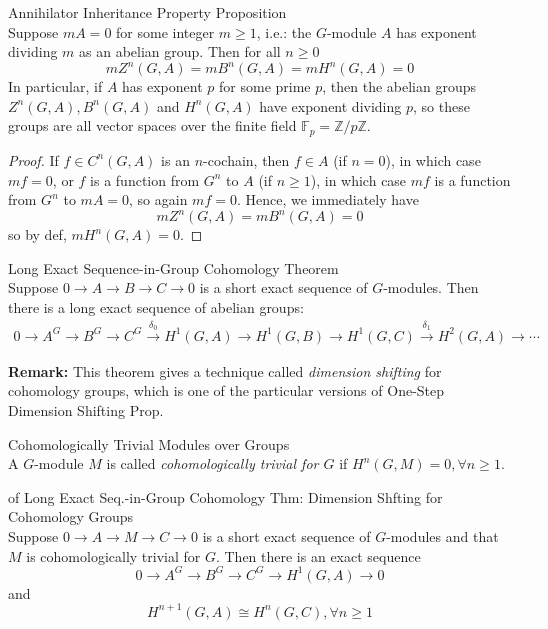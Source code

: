 \begin{proposition}{Annihilator Inheritance Property Proposition}\\
Suppose $mA=0$ for some integer $m\geq 1$, i.e.: the $G$-module $A$ has exponent dividing $m$ as an abelian group. Then for all $n\geq0$
\[
mZ^n(G,A)=m B^n(G,A)=m H^n(G,A)=0
\]
In particular, if $A$ has exponent $p$ for some prime $p$, then the abelian groups $Z^n(G,A), B^n(G,A)$ and $H^n(G,A)$ have exponent dividing $p$, so these groups are all vector spaces over the finite field $\mathbb{F}_p= \mathbb{Z}/p \mathbb{Z}$.
\end{proposition}

\begin{proof}
    If $f\in C^n(G,A)$ is an $n$-cochain, then $f\in A$ (if $n=0$), in which case $mf=0$, or $f$ is a function from $G^n$ to $A$ (if $n\geq1$), in which case $mf$ is a function from $G^n$ to $mA=0$, so again $mf=0$. Hence, we immediately have
    \[
    mZ^n(G,A)=mB^n(G,A)=0
    \]
    so by def, $mH^n(G,A)=0$.
\end{proof}

\begin{theorem}{Long Exact Sequence-in-Group Cohomology Theorem}\\
Suppose $0\to A\to B\to C\to0$ is a short exact sequence of $G$-modules. Then there is a long exact sequence of abelian groups:
\begin{align*}
    0\to A^G\to B^G\to C^G \xrightarrow{\delta_0} H^1(G,A) \to H^1(G,B) \to H^1(G,C) \xrightarrow{\delta_1} H^2(G,A)\to \cdots
\end{align*}
\end{theorem}

\noindent\textbf{Remark:} This theorem gives a technique called \textit{dimension shifting} for cohomology groups, which is one of the particular versions of One-Step Dimension Shifting Prop.

\begin{definition}{Cohomologically Trivial Modules over Groups}\\
A $G$-module $M$ is called \textit{cohomologically trivial for $G$} if $H^n(G,M)=0, \forall n\geq 1$.
\end{definition}

\begin{corollary}{of Long Exact Seq.-in-Group Cohomology Thm: Dimension Shfting for Cohomology Groups}\\
Suppose $0\to A\to M\to C\to0$ is a short exact sequence of $G$-modules and that $M$ is cohomologically trivial for $G$. Then there is an exact sequence
\[
0\to A^G\to B^G\to C^G\to H^1(G,A)\to0
\]
and
\[
H^{n+1} (G,A) \cong H^n(G,C) ,\forall n\geq 1
\]
\end{corollary}

